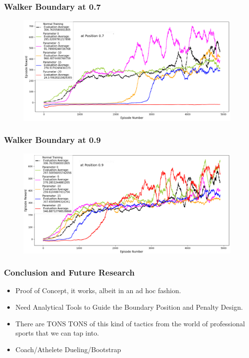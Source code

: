 \documentclass{beamer}
\begin{document}
\begin{frame}
\frametitle{Walker Boundary at 0.7}
\begin{figure}
    \centering
	\includegraphics[scale=0.35]{Walker_with_Boundary_at_0.7}
\end{figure}
\end{frame}

\begin{frame}
\frametitle{Walker Boundary at 0.9}
\begin{figure}
    \centering
	\includegraphics[scale=0.35]{Walker_with_Boundary_at_0.9}
\end{figure}
\end{frame}

\begin{frame}
\frametitle{Conclusion and Future Research}

	\begin{itemize}
		
		\item Proof of Concept, it works, albeit in an ad hoc fashion.

		\item Need Analytical Tools to Guide the Boundary Position and Penalty Design.

		\item There are TONS TONS of this kind of tactics from the world of professional sports that we can tap into.

		\item Coach/Athelete Dueling/Bootstrap
	\end{itemize}

\end{frame}
\end{document}
